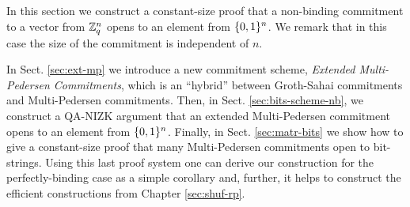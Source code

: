 In this section we construct a constant-size proof that a non-binding commitment to a vector from $\mathbb{Z}_q^n$ opens to an element from $\{0,1\}^n$. We remark that in this case the size of the commitment is independent of $n$. 

In Sect. \ref{sec:ext-mp} we introduce a new commitment scheme, \emph{Extended Multi-Pedersen Commitments}, which is an ``hybrid'' between Groth-Sahai commitments and Multi-Pedersen commitments.
Then, in Sect. \ref{sec:bits-scheme-nb}, we construct a QA-NIZK argument that an extended Multi-Pedersen commitment opens to an element from $\{0,1\}^n$. Finally, in Sect. \ref{sec:matr-bits} we show how to give a constant-size proof that many Multi-Pedersen commitments open to bit-strings. Using this last proof system one can derive our construction for the perfectly-binding case as a simple corollary and, further, it helps to construct the efficient constructions from Chapter \ref{sec:shuf-rp}.
